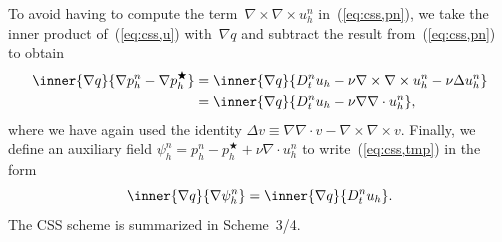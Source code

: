 To avoid having to compute the term~$\nabla \times \nabla \times
u_h^n$ in~(\ref{eq:css,pn}), we take the inner product
of~(\ref{eq:css,u}) with~$\nabla q$ and subtract the result
from~(\ref{eq:css,pn}) to obtain
\begin{equation}\label{eq:css,tmp}
 \begin{split}
   \inner{\nabla q}{\nabla p_h^n - \nabla p_h^{\bigstar}}
   &=
   \inner{\nabla q}{D_t^n u_h
   - \nu \nabla \times \nabla \times u_h^n - \nu \Delta u_h^n} \\
   &=
   \inner{\nabla q}{D_t^n u_h - \nu \nabla \nabla \cdot u_h^n},
 \end{split}
\end{equation}
where we have again used the identity $\Delta v \equiv \nabla \nabla
\cdot v - \nabla \times \nabla \times v$. Finally, we define an
auxiliary field $\psi_h^n = p_h^n - p_h^{\bigstar} + \nu \nabla
\cdot u_h^n$ to write~(\ref{eq:css,tmp}) in the form
\begin{equation}
  \inner{\nabla q}{\nabla \psi_h^n}
  = \inner{\nabla q}{D_t^n u_h}.
\end{equation}
The CSS scheme is summarized in Scheme~3/4.

